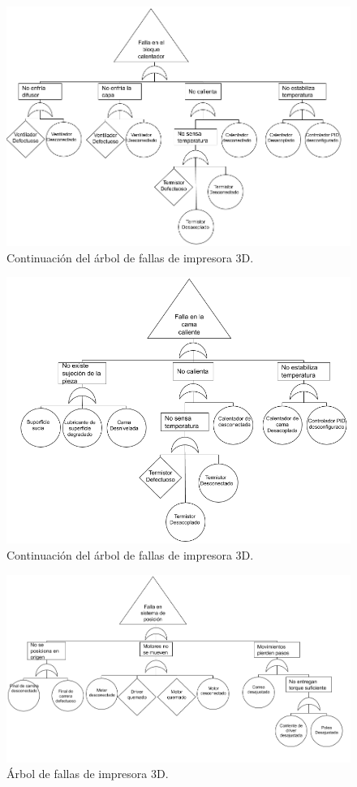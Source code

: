 \begin{figure}[H]
\centering
\includegraphics[scale=0.4]{images/arbol/arbol3.png}
\caption{Continuación del árbol de fallas de impresora 3D.}
\end{figure}

\begin{figure}[H]
\centering
\includegraphics[scale=0.4]{images/arbol/arbol4.png}
\caption{Continuación del árbol de fallas de impresora 3D.}
\end{figure}


\begin{figure}[H]
\centering
\includegraphics[scale=0.4]{images/arbol/arbol5.png}
\caption{Árbol de fallas de impresora 3D.}
\end{figure}


